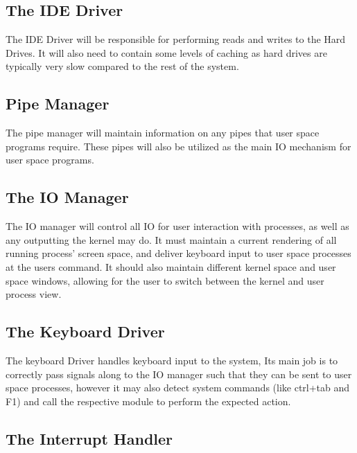 \documentclass[a4paper]{report}
\begin{document}
\subsection{The IDE Driver}

The IDE Driver will be responsible for performing reads and writes to the Hard Drives. It will also need to contain some levels of caching as hard drives are typically very slow compared to the rest of the system.

\subsection{Pipe Manager}

The pipe manager will maintain information on any pipes that user space programs require. These pipes will also be utilized as the main IO mechanism for user space programs.

\subsection{The IO Manager}

The IO manager will control all IO for user interaction with processes, as well as any outputting the kernel may do. It must maintain a current rendering of all running process' screen space, and deliver keyboard input to user space processes at the users command. It should also maintain different kernel space and user space windows, allowing for the user to switch between the kernel and user process view.


\subsection{The Keyboard Driver}

The keyboard Driver handles keyboard input to the system, Its main job is to correctly pass signals along to the IO manager such that they can be sent to user space processes, however it may also detect system commands (like ctrl+tab and F1) and call the respective module to perform the expected action.

\subsection{The Interrupt Handler}
\end{document}
